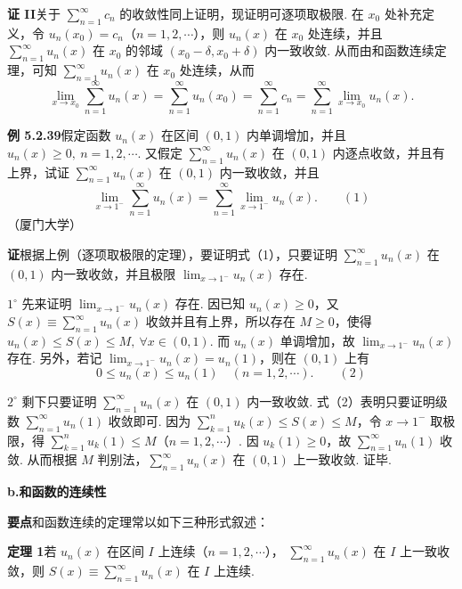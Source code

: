 \documentclass[UTF8,12pt,a4paper,fontset=fandol]{ctexart}
\begin{document}
\noindent\textbf{证 II}\quad 关于 $\displaystyle\sum_{n=1}^{\infty}c_n$ 的收敛性同上证明，现证明可逐项取极限.
在 $x_0$ 处补充定义，令 $u_n(x_0)=c_n$（$n=1,2,\cdots$），则 $u_n(x)$ 在
$x_0$ 处连续，并且 $\displaystyle\sum_{n=1}^{\infty}u_n(x)$ 在 $x_0$ 的邻域
$(x_0-\delta,x_0+\delta)$ 内一致收敛. 从而由和函数连续定理，可知
$\displaystyle\sum_{n=1}^{\infty}u_n(x)$ 在 $x_0$ 处连续，从而
\[
  \lim_{x\to x_0}\sum_{n=1}^{\infty}u_n(x)
  =\sum_{n=1}^{\infty}u_n(x_0)
  =\sum_{n=1}^{\infty}c_n
  =\sum_{n=1}^{\infty}\lim_{x\to x_0}u_n(x).
\]

\noindent\textbf{例 5.2.39}\quad 假定函数 $u_n(x)$ 在区间 $(0,1)$ 内单调增加，并且
$u_n(x)\ge0,\ n=1,2,\cdots$. 又假定 $\displaystyle\sum_{n=1}^{\infty}u_n(x)$ 在
$(0,1)$ 内逐点收敛，并且有上界，试证
$\displaystyle\sum_{n=1}^{\infty}u_n(x)$ 在 $(0,1)$ 内一致收敛，并且
\[
  \lim_{x\to1^-}\sum_{n=1}^{\infty}u_n(x)
  =\sum_{n=1}^{\infty}\lim_{x\to1^-}u_n(x).
\qquad(1)
\]
（厦门大学）

\noindent\textbf{证}\quad 根据上例（逐项取极限的定理），要证明式（1），只要证明
$\displaystyle\sum_{n=1}^{\infty}u_n(x)$ 在 $(0,1)$ 内一致收敛，并且极限
$\displaystyle\lim_{x\to1^-}u_n(x)$ 存在.

$1^\circ$ 先来证明 $\displaystyle\lim_{x\to1^-}u_n(x)$ 存在. 因已知
$u_n(x)\ge0$，又 $S(x)\equiv\displaystyle\sum_{n=1}^{\infty}u_n(x)$ 收敛并且有上界，所以存在
$M\ge0$，使得 $u_n(x)\le S(x)\le M,\ \forall x\in(0,1)$. 而 $u_n(x)$ 单调增加，故
$\displaystyle\lim_{x\to1^-}u_n(x)$ 存在. 另外，若记
$\displaystyle\lim_{x\to1^-}u_n(x)=u_n(1)$，则在 $(0,1)$ 上有
\[
  0\le u_n(x)\le u_n(1)\quad(n=1,2,\cdots).
\qquad(2)
\]

$2^\circ$ 剩下只要证明 $\displaystyle\sum_{n=1}^{\infty}u_n(x)$ 在 $(0,1)$ 内一致收敛. 式（2）表明只要证明级数
$\displaystyle\sum_{n=1}^{\infty}u_n(1)$ 收敛即可. 因为
$\displaystyle\sum_{k=1}^{n}u_k(x)\le S(x)\le M$，令 $x\to1^-$ 取极限，得
$\displaystyle\sum_{k=1}^{n}u_k(1)\le M$（$n=1,2,\cdots$）. 因
$u_k(1)\ge0$，故 $\displaystyle\sum_{n=1}^{\infty}u_n(1)$ 收敛. 从而根据
$M$ 判别法，$\displaystyle\sum_{n=1}^{\infty}u_n(x)$ 在 $(0,1)$ 上一致收敛. 证毕.

\noindent\textbf{b.\quad 和函数的连续性}

\noindent\textbf{要点}\quad 和函数连续的定理常以如下三种形式叙述：

\noindent\textbf{定理 1}\quad 若 $u_n(x)$ 在区间 $I$ 上连续（$n=1,2,\cdots$），
$\displaystyle\sum_{n=1}^{\infty}u_n(x)$ 在 $I$ 上一致收敛，则
$S(x)\equiv\displaystyle\sum_{n=1}^{\infty}u_n(x)$ 在 $I$ 上连续.
\end{document}
